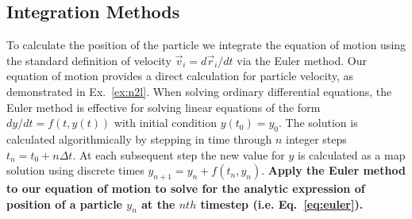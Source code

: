 \documentclass[twocolumn,preprintnumbers,amsmath,amssymb,aps,prx]{revtex4}
\begin{document}
  \subsection{Integration Methods}
  \label{ex:euler}
    To calculate the position of the particle we
    integrate the equation of motion using
    the standard definition of velocity
    $\vec{v}_i = d\vec{r}_i/dt$ 
    via the 
    Euler method. %
    Our equation of motion provides
    a direct calculation for particle velocity,
    as demonstrated in Ex.~\ref{ex:n2l}.  
  When solving ordinary differential equations,
  the Euler method is effective for solving linear equations
  of the form
  $dy/dt = f(t,y(t))$ with initial condition $y(t_0) = y_0$.
  The solution is calculated algorithmically
  by stepping in time through $n$ integer steps
  $t_n = t_0 + n \Delta t$.
  At each subsequent step the new
  value for $y$ is calculated as a map solution using
  discrete times 
  $y_{n+1} = y_n + f(t_n,y_n)$.
    {\bf Apply the Euler method to our equation
  of motion to solve for the analytic expression
  of position of a particle
  $y_n$ at the $nth$ timestep (i.e. Eq.~\ref{eq:euler}).}
    
\end{document}

